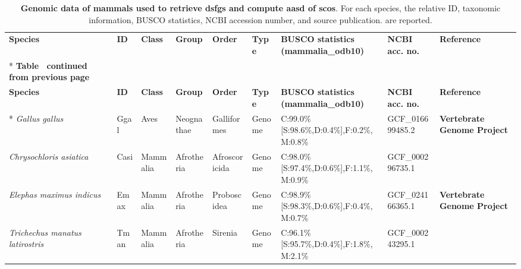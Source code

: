 \documentclass[../main.tex]{subfiles}
\begin{document}
\begin{landscape}
	\begin{longtable}{lllllllll}
		\caption{\textbf{Genomic data of mammals used to retrieve \glspl{dsfg} and compute \gls{aasd} of \glspl{sco}}. For each species, the relative ID, taxonomic information, BUSCO statistics, NCBI accession number, and source publication. are reported.}
		\label{supp_tab:mammal_dataset}                                                                                                                                                                                                                   \\
		\toprule
		\textbf{Species}                        & \textbf{ID} & \textbf{Class} & \textbf{Group}   & \textbf{Order}  & \textbf{Type} & \textbf{BUSCO statistics (mammalia\_odb10)}    & \textbf{NCBI acc. no.} & \textbf{Reference}                        \\* \midrule \midrule
		\endfirsthead
		\multicolumn{9}{c}%
		{{\bfseries Table \thetable\ continued from previous page}}                                                                                                                                                                                       \\
		\toprule
		\textbf{Species}                        & \textbf{ID} & \textbf{Class} & \textbf{Group}   & \textbf{Order}  & \textbf{Type} & \textbf{BUSCO statistics (mammalia\_odb10)}    & \textbf{NCBI acc. no.} & \textbf{Reference}                        \\* \midrule \midrule
		\endhead
		\textit{Gallus gallus}                  & Ggal        & Aves           & Neognathae       & Galliformes     & Genome        & C:99.0\%{[}S:98.6\%,D:0.4\%{]},F:0.2\%,M:0.8\% & GCF\_016699485.2       & \textbf{Vertebrate Genome Project}        \\
		\textit{Chrysochloris asiatica}         & Casi        & Mammalia       & Afrotheria       & Afroscoricida   & Genome        & C:98.0\%{[}S:97.4\%,D:0.6\%{]},F:1.1\%,M:0.9\% & GCF\_000296735.1       & \textbf{\cite{murata2003afrotherian}}     \\
		\textit{Elephas maximus indicus}        & Emax        & Mammalia       & Afrotheria       & Proboscidea     & Genome        & C:98.9\%{[}S:98.3\%,D:0.6\%{]},F:0.4\%,M:0.7\% & GCF\_024166365.1       & \textbf{Vertebrate Genome Project}        \\
		\textit{Trichechus manatus latirostris} & Tman        & Mammalia       & Afrotheria       & Sirenia         & Genome        & C:96.1\%{[}S:95.7\%,D:0.4\%{]},F:1.8\%,M:2.1\% & GCF\_000243295.1       & \textbf{\cite{foote2015convergent}}       \\

\end{longtable}
\end{landscape}
\end{document}

